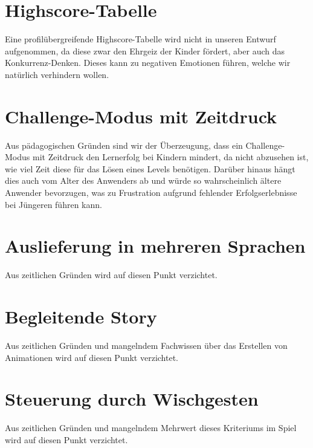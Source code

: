 \documentclass[11pt,a4paper]{report}
\begin{document}
\section{Highscore-Tabelle}

Eine profilübergreifende Highscore-Tabelle wird nicht in unseren Entwurf aufgenommen, da diese zwar den Ehrgeiz der Kinder fördert, aber auch das Konkurrenz-Denken. Dieses kann zu negativen Emotionen führen, welche wir natürlich verhindern wollen.

\section{Challenge-Modus mit Zeitdruck}

Aus pädagogischen Gründen sind wir der Überzeugung, dass ein Challenge-Modus mit Zeitdruck den Lernerfolg bei Kindern mindert, da nicht abzusehen ist, wie viel Zeit diese für das Lösen eines Levels benötigen. Darüber hinaus hängt dies auch vom Alter des Anwenders ab und würde so wahrscheinlich ältere Anwender bevorzugen, was zu Frustration aufgrund fehlender Erfolgserlebnisse bei Jüngeren führen kann.

\section{Auslieferung in mehreren Sprachen}

Aus zeitlichen Gründen wird auf diesen Punkt verzichtet.

\section{Begleitende Story}

Aus zeitlichen Gründen und mangelndem Fachwissen über das Erstellen von Animationen wird auf diesen Punkt verzichtet.

\section{Steuerung durch Wischgesten}

Aus zeitlichen Gründen und mangelndem Mehrwert dieses Kriteriums im Spiel wird auf diesen Punkt verzichtet.
\end{document}
